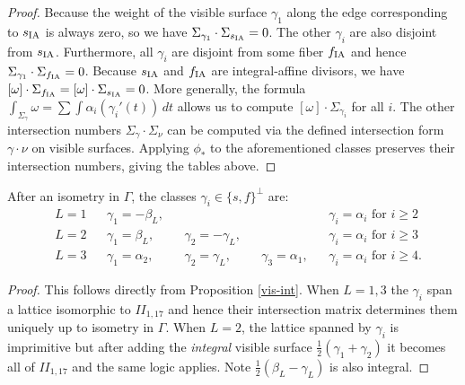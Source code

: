 \documentclass[table,x11names]{amsart}
\begin{document}
  \begin{proof} Because the weight of the visible surface $\gamma_1$
  along the edge corresponding to $s_{{\rm IA}}$ is always zero, so
  we have $\Sigma_{\gamma_1} \cdot \Sigma_{s_{{\rm IA}}}=0$. The other $\gamma_i$ 
  are also disjoint from $s_{{\rm IA}}$. Furthermore, all $\gamma_i$ are disjoint
  from some fiber $f_{{\rm IA}}$ and hence $\Sigma_{\gamma_1} \cdot \Sigma_{f_{{\rm IA}}}=0$.
  Because $s_{{\rm IA}}$ and $f_{{\rm IA}}$ are integral-affine divisors, we have
  $[\omega] \cdot \Sigma_{f_{{\rm IA}}}  = [\omega]\cdot \Sigma_{s_{{\rm IA}}}  =0$.
  More generally, the formula $\int_{\Sigma_\gamma} \omega =\sum \int \alpha_i(\gamma_i'(t))\,dt$
  allows us to compute $[\omega]\cdot \Sigma_{\gamma_i}$ for all $i$.
  The other intersection numbers $\Sigma_\gamma \cdot \Sigma_\nu$ 
  can be computed via the defined intersection form $\gamma\cdot \nu$ on visible surfaces.
  Applying $\phi_*$ to the aforementioned classes
  preserves their intersection numbers, giving the tables above.
    \end{proof}

\begin{corollary}\label{identifygamma}
  After an isometry in $\Gamma$,
  the classes $\gamma_i \in \{s,f\}^\perp$ are:
\begin{align*}
&L=1 && \gamma_1 = -\beta_L,&& && && \gamma_i=\alpha_i \textrm{ for }i\geq 2 \\
& L=2 && \gamma_1 = \beta_L, && \gamma_2 = -\gamma_L, && && \gamma_i=\alpha_i \textrm{ for } i\geq 3 \\
& L=3 && \gamma_1 = \alpha_2, && \gamma_2 = \gamma_L, && \gamma_3=\alpha_1, && \gamma_i=\alpha_i \textrm{ for } i\geq 4.
\end{align*}
\end{corollary}
 
 \begin{proof} This follows directly from Proposition \ref{vis-int}. When $L=1,3$ the
 $\gamma_i$ span a lattice isomorphic to $I\!I_{1,17}$ and hence their intersection matrix
 determines them uniquely up to isometry in $\Gamma$. When $L=2$,
 the lattice spanned by $\gamma_i$ is imprimitive
 but after adding the {\it integral} visible surface
 $\frac{1}{2}(\gamma_1+\gamma_2)$ it becomes all of $I\!I_{1,17}$ and the same logic
 applies. Note $\frac{1}{2}(\beta_L-\gamma_L)$ is also integral.\end{proof}
\end{document}
